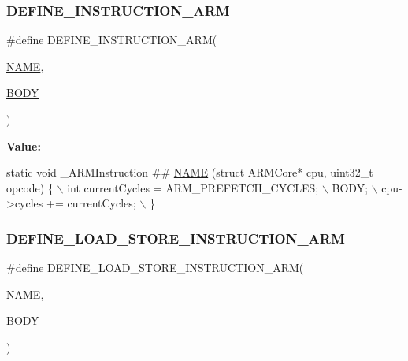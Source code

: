 \subsubsection{\texorpdfstring{D\+E\+F\+I\+N\+E\+\_\+\+I\+N\+S\+T\+R\+U\+C\+T\+I\+O\+N\+\_\+\+A\+RM}{DEFINE\_INSTRUCTION\_ARM}}
{\footnotesize\ttfamily \#define D\+E\+F\+I\+N\+E\+\_\+\+I\+N\+S\+T\+R\+U\+C\+T\+I\+O\+N\+\_\+\+A\+RM(\begin{DoxyParamCaption}\item[{}]{\mbox{\hyperlink{inflate_8h_a164ea0159d5f0b5f12a646f25f99eceaa67bc2ced260a8e43805d2480a785d312}{N\+A\+ME}},  }\item[{}]{\mbox{\hyperlink{gzlog_8c_aa6bdf6a6d9916c343e1e17774d84a156}{B\+O\+DY}} }\end{DoxyParamCaption})}

{\bfseries Value\+:}
\begin{DoxyCode}
\textcolor{keyword}{static} \textcolor{keywordtype}{void} \_ARMInstruction ## \mbox{\hyperlink{inflate_8h_a164ea0159d5f0b5f12a646f25f99eceaa67bc2ced260a8e43805d2480a785d312}{NAME}} (\textcolor{keyword}{struct} ARMCore* cpu, uint32\_t opcode) \{ \(\backslash\)
        int currentCycles = ARM\_PREFETCH\_CYCLES; \(\backslash\)
        BODY; \(\backslash\)
        cpu->cycles += currentCycles; \(\backslash\)
    \}
\end{DoxyCode}
\mbox{\label{isa-arm_8c_a9ed757c169152fcb203fba1b85c7860a}} 
\subsubsection{\texorpdfstring{D\+E\+F\+I\+N\+E\+\_\+\+L\+O\+A\+D\+\_\+\+S\+T\+O\+R\+E\+\_\+\+I\+N\+S\+T\+R\+U\+C\+T\+I\+O\+N\+\_\+\+A\+RM}{DEFINE\_LOAD\_STORE\_INSTRUCTION\_ARM}}
{\footnotesize\ttfamily \#define D\+E\+F\+I\+N\+E\+\_\+\+L\+O\+A\+D\+\_\+\+S\+T\+O\+R\+E\+\_\+\+I\+N\+S\+T\+R\+U\+C\+T\+I\+O\+N\+\_\+\+A\+RM(\begin{DoxyParamCaption}\item[{}]{\mbox{\hyperlink{inflate_8h_a164ea0159d5f0b5f12a646f25f99eceaa67bc2ced260a8e43805d2480a785d312}{N\+A\+ME}},  }\item[{}]{\mbox{\hyperlink{gzlog_8c_aa6bdf6a6d9916c343e1e17774d84a156}{B\+O\+DY}} }\end{DoxyParamCaption})}

